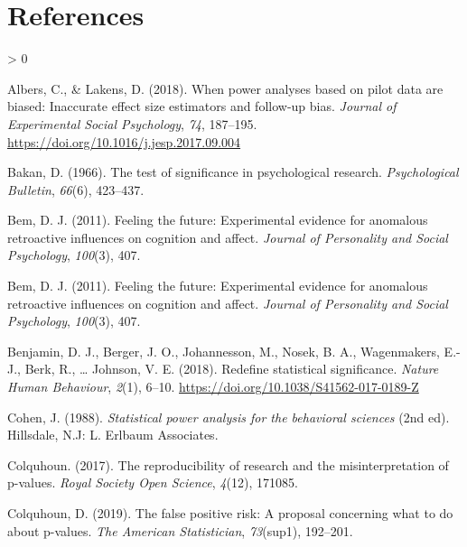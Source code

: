 \documentclass[
  english,
  ,man,floatsintext]{apa6}
\newlength{\cslhangindent}
\newenvironment{CSLReferences}[2] %
 {%
  \setlength{\parindent}{0pt}
  \ifodd #1 \everypar{\setlength{\hangindent}{\cslhangindent}}\ignorespaces\fi
  \ifnum #2 > 0
  \setlength{\parskip}{#2\baselineskip}
  \fi
 }%
 {}
\begin{document}
\hypertarget{references}{%
\section{References}\label{references}}

\setlength{\parindent}{-0.5in}
\setlength{\leftskip}{0.5in}

\hypertarget{refs}{}
\begin{CSLReferences}{1}{0}
\leavevmode\hypertarget{ref-albers_when_2018}{}%
Albers, C., \& Lakens, D. (2018). When power analyses based on pilot data are biased: {Inaccurate} effect size estimators and follow-up bias. \emph{Journal of Experimental Social Psychology}, \emph{74}, 187--195. \url{https://doi.org/10.1016/j.jesp.2017.09.004}

\leavevmode\hypertarget{ref-bakan_test_1966}{}%
Bakan, D. (1966). The test of significance in psychological research. \emph{Psychological Bulletin}, \emph{66}(6), 423--437.

\leavevmode\hypertarget{ref-bem2011feeling}{}%
Bem, D. J. (2011). Feeling the future: Experimental evidence for anomalous retroactive influences on cognition and affect. \emph{Journal of Personality and Social Psychology}, \emph{100}(3), 407.

\leavevmode\hypertarget{ref-bem2011feeling}{}%
Bem, D. J. (2011). Feeling the future: Experimental evidence for anomalous retroactive influences on cognition and affect. \emph{Journal of Personality and Social Psychology}, \emph{100}(3), 407.

\leavevmode\hypertarget{ref-benjamin_redefine_2018}{}%
Benjamin, D. J., Berger, J. O., Johannesson, M., Nosek, B. A., Wagenmakers, E.-J., Berk, R., \ldots{} Johnson, V. E. (2018). Redefine statistical significance. \emph{Nature Human Behaviour}, \emph{2}(1), 6--10. \url{https://doi.org/10.1038/S41562-017-0189-Z}

\leavevmode\hypertarget{ref-cohen_statistical_1988}{}%
Cohen, J. (1988). \emph{Statistical power analysis for the behavioral sciences} (2nd ed). {Hillsdale, N.J}: {L. Erlbaum Associates}.

\leavevmode\hypertarget{ref-colquhoun2017reproducibility}{}%
Colquhoun. (2017). The reproducibility of research and the misinterpretation of p-values. \emph{Royal Society Open Science}, \emph{4}(12), 171085.

\leavevmode\hypertarget{ref-colquhoun2019false}{}%
Colquhoun, D. (2019). The false positive risk: A proposal concerning what to do about p-values. \emph{The American Statistician}, \emph{73}(sup1), 192--201.


\end{CSLReferences}
\end{document}
